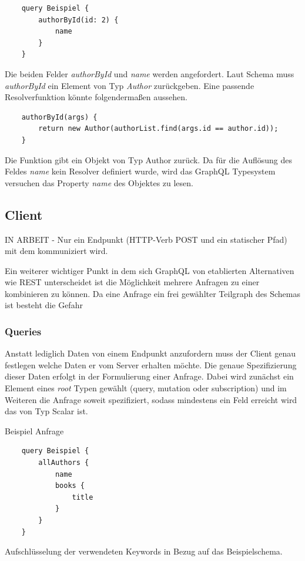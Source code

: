 \documentclass[11pt]{article}
\begin{document}
\begin{verbatim}
	query Beispiel {
		authorById(id: 2) {
			name
		}
	}
\end{verbatim}

Die beiden Felder \textit{authorById} und \textit{name} werden angefordert. Laut Schema muss  \textit{authorById} ein Element von Typ \textit{Author} zurückgeben. Eine passende Resolverfunktion könnte folgendermaßen aussehen.
\begin{verbatim}
	authorById(args) {
		return new Author(authorList.find(args.id == author.id));
	}
\end{verbatim}

Die Funktion gibt ein Objekt von Typ Author zurück. Da für die Auflösung des Feldes \textit{name} kein Resolver definiert wurde, wird das GraphQL Typesystem versuchen das Property \textit{name} des Objektes zu lesen.


\subsection{Client}

IN ARBEIT
- Nur ein Endpunkt (HTTP-Verb POST und ein statischer Pfad) mit dem kommuniziert wird.

Ein weiterer wichtiger Punkt in dem sich GraphQL von etablierten Alternativen wie REST unterscheidet ist die Möglichkeit mehrere Anfragen zu einer kombinieren zu können. 
Da eine Anfrage ein frei gewählter Teilgraph des Schemas ist besteht die Gefahr 

\subsubsection{Queries}
Anstatt lediglich Daten von einem Endpunkt anzufordern muss der Client genau festlegen welche Daten er vom Server erhalten möchte. Die genaue Spezifizierung dieser Daten erfolgt in der Formulierung einer Anfrage. Dabei wird zunächst ein Element eines \textit{root} Typen gewählt (query, mutation oder subscription) und im Weiteren die Anfrage soweit spezifiziert, sodass mindestens ein Feld erreicht wird das von Typ Scalar ist. 

Beispiel Anfrage
\begin{verbatim}
	query Beispiel {
		allAuthors {
			name
			books {
				title
			}
		}
	}
\end{verbatim}

Aufschlüsselung der verwendeten Keywords in Bezug auf das Beispielschema.
\end{document}
